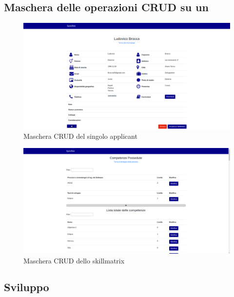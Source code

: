 \subsection{Maschera delle operazioni CRUD su un\applicant}
\vspace{0.5em}
\begin{figure}[!h] 
	\centering 
	\includegraphics[width=1\columnwidth]{immagini/svil/applicant}
	\caption{Maschera CRUD del singolo applicant}
	\label{figura:applicant}
\end{figure}

\vspace{0.5em}
\begin{figure}[!h] 
	\centering 
	\includegraphics[width=1\columnwidth]{immagini/svil/skillmatrix} 
	\caption{Maschera CRUD dello skillmatrix}
	\label{figura:skillmatrix}
\end{figure}


\subsection{Sviluppo}
